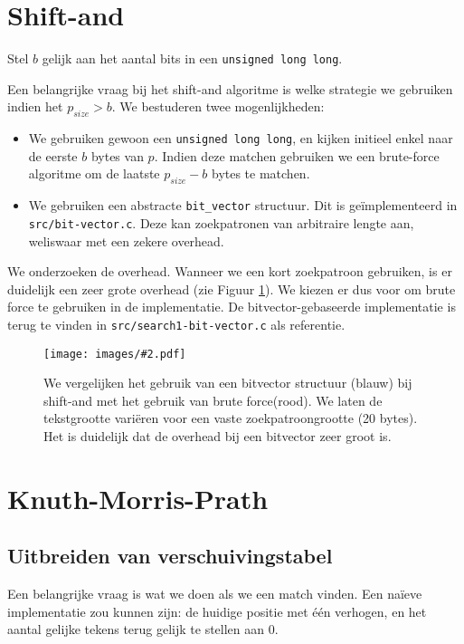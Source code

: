 \documentclass[a4paper,11pt]{article}
\newcommand{\image}[3][1]{
    \begin{figure}
    \begin{center}
    \texttt{[image: images/\#2.pdf]}
    \caption{#3}
    \label{fig:#2}
    \end{center}
    \end{figure}
}
\begin{document}
\section{Shift-and}

Stel $b$ gelijk aan het aantal bits in een \verb#unsigned long long#.

Een belangrijke vraag bij het shift-and algoritme is welke strategie we
gebruiken indien het $p_{size} > b$. We bestuderen twee mogenlijkheden:

\begin{itemize}
    \item We gebruiken gewoon een \verb#unsigned long long#, en kijken initieel
    enkel naar de eerste $b$ bytes van $p$. Indien deze matchen gebruiken we een
    brute-force algoritme om de laatste $p_{size} - b$ bytes te matchen.
    \item We gebruiken een abstracte \verb$bit_vector$ structuur. Dit is
    ge\"implementeerd in \verb#src/bit-vector.c#. Deze kan zoekpatronen van
    arbitraire lengte aan, weliswaar met een zekere overhead.
\end{itemize}

We onderzoeken de overhead. Wanneer we een kort zoekpatroon gebruiken, is er
duidelijk een zeer grote overhead (zie Figuur \ref{fig:plot-bit-vector}).
We kiezen er dus voor om brute force te gebruiken in de implementatie.
De bitvector-gebaseerde implementatie is terug te vinden in
\verb#src/search1-bit-vector.c# als referentie.

\image{plot-bit-vector}{We vergelijken het gebruik van een bitvector structuur
(blauw) bij shift-and met het gebruik van brute force(rood). We laten de
tekstgrootte vari\"eren voor een vaste zoekpatroongrootte (20 bytes). Het is
duidelijk dat de overhead bij een bitvector zeer groot is.}

\section{Knuth-Morris-Prath}

\subsection{Uitbreiden van verschuivingstabel}

Een belangrijke vraag is wat we doen als we een match vinden. Een na\"ieve
implementatie zou kunnen zijn: de huidige positie met \'e\'en verhogen, en het
aantal gelijke tekens terug gelijk te stellen aan 0.
\end{document}
